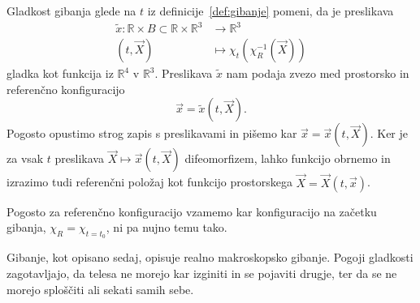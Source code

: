 \documentclass[12pt,a4paper,twoside]{article}
\theoremstyle{definition} %
\theoremstyle{plain} %
\numberwithin{equation}{section}
\newcommand{\R}{\mathbb R}
\newcommand{\vX}{\vec{X}}
\newcommand{\vx}{\vec{x}}
\begin{document}
Gladkost gibanja glede na $t$ iz definicije~\ref{def:gibanje} pomeni, da je
preslikava
\begin{align}
  \tilde{x}\colon \R \times B \subset \R \times \R^3&\to \R^3 \nonumber \\
  (t, \vX) &\mapsto \chi_t(\chi_R^{-1}(\vX))
\end{align}
gladka kot funkcija iz $\R^4$ v $\R^3$.
Preslikava $\tilde x$ nam podaja zvezo med prostorsko in referenčno konfiguracijo
\begin{equation}
  \label{eq:pros-ref}
  \vx = \tilde x(t, \vX).
\end{equation}
Pogosto opustimo strog zapis s preslikavami in pišemo kar $\vx = \vx(t, \vX)$.
Ker je za vsak $t$ preslikava $\vX \mapsto \vx(t, \vX)$ difeomorfizem, lahko funkcijo
obrnemo in izrazimo tudi referenčni položaj kot funkcijo prostorskega $\vX = \vX(t, \vx)$.

Pogosto za referenčno konfiguracijo vzamemo kar konfiguracijo na začetku
gibanja, $\chi_R = \chi_{t=t_0}$, ni pa nujno temu tako.

Gibanje, kot opisano sedaj, opisuje realno makroskopsko gibanje. Pogoji gladkosti zagotavljajo, da
telesa ne morejo kar izginiti in se pojaviti drugje, ter da se ne morejo sploščiti ali sekati samih
sebe.
\end{document}
